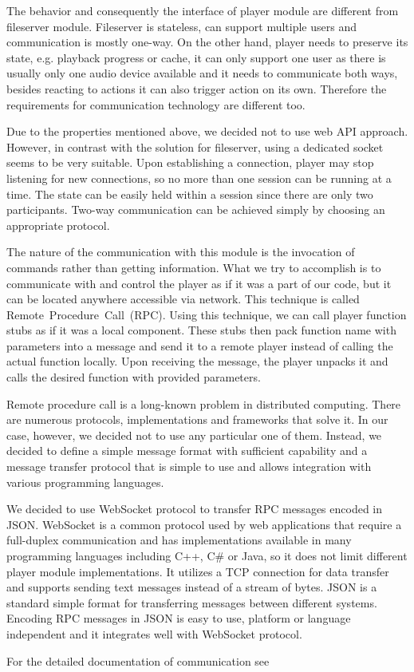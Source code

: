 The behavior and consequently the interface of player module are different from fileserver module. Fileserver is stateless, can support multiple users and communication is mostly one-way. On the other hand, player needs to preserve its state, e.g. playback progress or cache, it can only support one user as there is usually only one audio device available and it needs to communicate both ways, besides reacting to actions it can also trigger action on its own. Therefore the requirements for communication technology are different too.
\par
Due to the properties mentioned above, we decided not to use web API approach. However, in contrast with the solution for fileserver, using a dedicated socket seems to be very suitable. Upon establishing a connection, player may stop listening for new connections, so no more than one session can be running at a time. The state can be easily held within a session since there are only two participants. Two-way communication can be achieved simply by choosing an appropriate protocol.
\par
The nature of the communication with this module is the invocation of commands rather than getting information. What we try to accomplish is to communicate with and control the player as if it was a part of our code, but it can be located anywhere accessible via network. This technique is called Remote~Procedure~Call~(RPC). Using this technique, we can call player function stubs as if it was a local component. These stubs then pack function name with parameters into a message and send it to a remote player instead of calling the actual function locally. Upon receiving the message, the player unpacks it and calls the desired function with provided parameters.
\par
Remote procedure call is a long-known problem in distributed computing. There are numerous protocols, implementations and frameworks that solve it. In our case, however, we decided not to use any particular one of them. Instead, we decided to define a simple message format with sufficient capability and a message transfer protocol that is simple to use and allows integration with various programming languages.
\par
We decided to use WebSocket protocol to transfer RPC messages encoded in JSON. WebSocket is a common protocol used by web applications that require a full-duplex communication and has implementations available in many programming languages including C++, C# or Java, so it does not limit different player module implementations. It utilizes a TCP connection for data transfer and supports sending text messages instead of a stream of bytes. JSON is a standard simple format for transferring messages between different systems. Encoding RPC messages in JSON is easy to use, platform or language independent and it integrates well with WebSocket protocol.
\par
For the detailed documentation of communication see 

